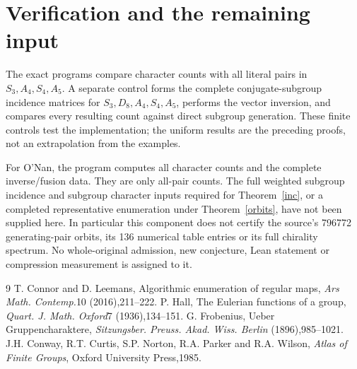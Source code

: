 \documentclass[11pt,a4paper]{article}
\begin{document}
\section{Verification and the remaining input}
The exact programs compare character counts with all literal pairs in
$S_3,A_4,S_4,A_5$. A separate control forms the complete conjugate-subgroup
incidence matrices for $S_3,D_8,A_4,S_4,A_5$, performs the vector inversion,
and compares every resulting count against direct subgroup generation.
These finite controls test the implementation; the uniform results are the
preceding proofs, not an extrapolation from the examples.

For O'Nan, the program computes all character counts and the complete
inverse/fusion data. They are only all-pair counts. The full weighted
subgroup incidence and subgroup character inputs required for
Theorem~\ref{inc}, or a completed representative enumeration under
Theorem~\ref{orbits}, have not been supplied here. In particular this
component does not certify the source's 796772 generating-pair orbits,
its 136 numerical table entries or its full chirality spectrum. No
whole-original admission, new conjecture, Lean statement or compression
measurement is assigned to it.
\begin{thebibliography}{9}
 T. Connor and D. Leemans, Algorithmic enumeration of regular
maps, \emph{Ars Math. Contemp.}10 (2016),211--222.
 P. Hall, The Eulerian functions of a group,
\emph{Quart. J. Math. Oxford}7 (1936),134--151.
 G. Frobenius, Ueber Gruppencharaktere,
\emph{Sitzungsber. Preuss. Akad. Wiss. Berlin} (1896),985--1021.
 J.H. Conway, R.T. Curtis, S.P. Norton, R.A. Parker and
R.A. Wilson, \emph{Atlas of Finite Groups}, Oxford University Press,1985.
\end{thebibliography}
\end{document}
